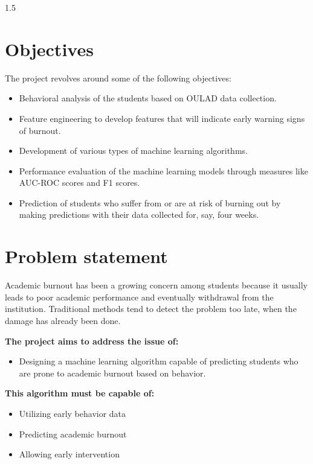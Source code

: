 \begin{spacing}{1.5}
\section{Objectives}
The project revolves around some of the following objectives:
\begin{itemize}
    \item Behavioral analysis of the students based on OULAD data collection.

\item Feature engineering to develop features that will indicate early warning signs of burnout.

\item Development of various types of machine learning algorithms.

\item Performance evaluation of the machine learning models through measures like AUC-ROC scores and F1 scores.

\item Prediction of students who suffer from or are at risk of burning out by making predictions with their data collected for, say, four weeks.

\end{itemize}


\section{Problem statement}
Academic burnout has been a growing concern among students because it usually leads to poor academic performance and eventually withdrawal from the institution. Traditional methods tend to detect the problem too late, when the damage has already been done.

\textbf{The project aims to address the issue of:}

\begin{itemize}
    \item Designing a machine learning algorithm capable of predicting 
students who are prone to academic burnout based on 
behavior.
\end{itemize}

\textbf{This algorithm must be capable of:}
\begin{itemize}
    \item  Utilizing early behavior data 
\item Predicting academic burnout
\item Allowing early intervention
\end{itemize}





\end{spacing}
